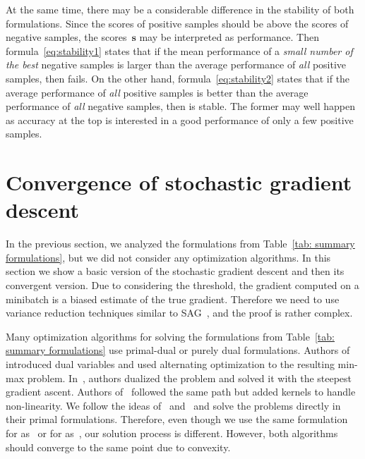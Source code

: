At the same time, there may be a considerable difference in the stability of both formulations. Since the scores of positive samples should be above the scores of negative samples, the scores~$\bm{s}$ may be interpreted as performance. Then formula~\eqref{eq:stability1} states that if the mean performance of a \emph{small number of the best} negative samples is larger than the average performance of \emph{all} positive samples, then \tauFPL fails. On the other hand, formula~\eqref{eq:stability2} states that if the average performance of \emph{all} positive samples is better than the average performance of \emph{all} negative samples, then \PatMatNP is stable. The former may well happen as accuracy at the top is interested in a good performance of only a few positive samples.

\section{Convergence of stochastic gradient descent}\label{sec:convergence}

In the previous section, we analyzed the formulations from Table~\ref{tab: summary formulations}, but we did not consider any optimization algorithms. In this section we show a basic version of the stochastic gradient descent and then its convergent version. Due to considering the threshold, the gradient computed on a minibatch is a biased estimate of the true gradient. Therefore we need to use variance reduction techniques similar to SAG~\cite{schmidt2017minimizing}, and the proof is rather complex.

Many optimization algorithms for solving the formulations from Table~\ref{tab: summary formulations} use primal-dual or purely dual formulations. Authors of~\cite{eban2017scalable} introduced dual variables and used alternating optimization to the resulting min-max problem. In~\cite{li2014top, zhang2018tau}, authors dualized the problem and solved it with the steepest gradient ascent. Authors of~\cite{macha2020nonlinear} followed the same path but added kernels to handle non-linearity. We follow the ideas of~\cite{mackey2018constrained} and~\cite{adam2019machine} and solve the problems directly in their primal formulations. Therefore, even though we use the same formulation for \TopPush as~\cite{li2014top} or for \tauFPL as~\cite{zhang2018tau}, our solution process is different. However, both algorithms should converge to the same point due to convexity.

